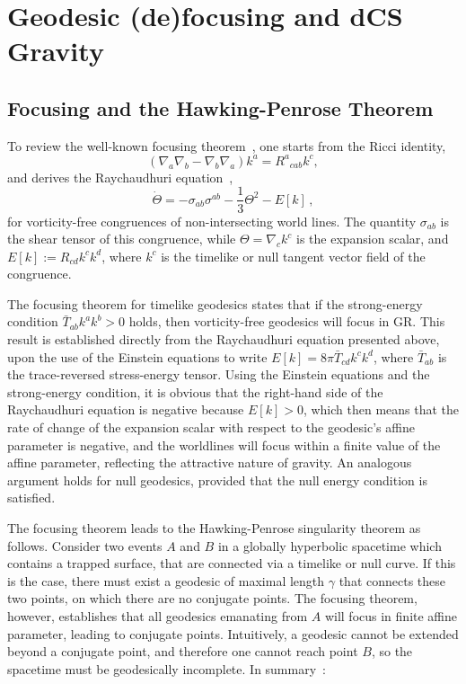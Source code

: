 \documentclass[prd,twocolumn,showpacs,superscriptaddress,nofootinbib]{revtex4-2}
\newcommand\be{\begin{equation}}
\newcommand\ee{\end{equation}}
\begin{document}
\section{Geodesic (de)focusing and dCS Gravity}

\subsection{Focusing and the Hawking-Penrose Theorem}

To review the well-known focusing theorem~\cite{1955PhRv...98.1123R},  one starts from the Ricci identity,
%
\be 
(\nabla_{a}\nabla_{b} - \nabla_{b}\nabla_{a})k^{a} = R^{a}{}_{cab} k^{c},
\ee
%
and derives the Raychaudhuri equation~\cite{1955PhRv...98.1123R},
%
\be 
\dot{\Theta} = -\sigma_{ab}\sigma^{ab}- \frac{1}{3} \Theta^{2} - E[k]\,,
\ee
%
for vorticity-free congruences of non-intersecting world lines. The quantity $\sigma_{ab}$ is the shear tensor of this congruence, while $\Theta=\nabla_{c}k^{c}$ is the expansion scalar, and $E[k] := R_{cd}k^{c}k^{d}$, where $k^c$ is the timelike or null tangent vector field of the congruence. 

The focusing theorem for timelike geodesics states that if the strong-energy condition $\bar{T}_{ab} k^a k^b > 0$ holds, then vorticity-free geodesics will focus in GR. This result is established directly from the  Raychaudhuri equation presented above, upon the use of the Einstein equations to write $E[k]= 8 \pi \bar{T}_{cd}k^{c}k^{d}$, where $\bar{T}_{ab}$ is the trace-reversed stress-energy tensor. Using the Einstein equations and the strong-energy condition, it is obvious that the right-hand side of the Raychaudhuri equation is negative because $E[k] > 0$, which then means that the rate of change of the expansion scalar with respect to the geodesic's affine parameter is negative, and the worldlines will focus within a finite value of the affine parameter, reflecting the attractive nature of gravity. An analogous argument holds for null geodesics, provided that the null energy condition is satisfied.

The focusing theorem leads to the Hawking-Penrose singularity theorem as follows. Consider two events $A$ and $B$ in a globally hyperbolic spacetime which contains a trapped surface, that are connected via a timelike or null curve. If this is the case, there must exist a geodesic of maximal length $\gamma$ that connects these two points, on which there are no conjugate points. The focusing theorem, however, establishes that all geodesics emanating from $A$ will focus in finite affine parameter, leading to conjugate points. Intuitively, a geodesic cannot be extended beyond a conjugate point, and therefore one cannot reach point $B$, so the spacetime must be geodesically incomplete. In summary~\cite{Hawking:1969sw}:
\end{document}
